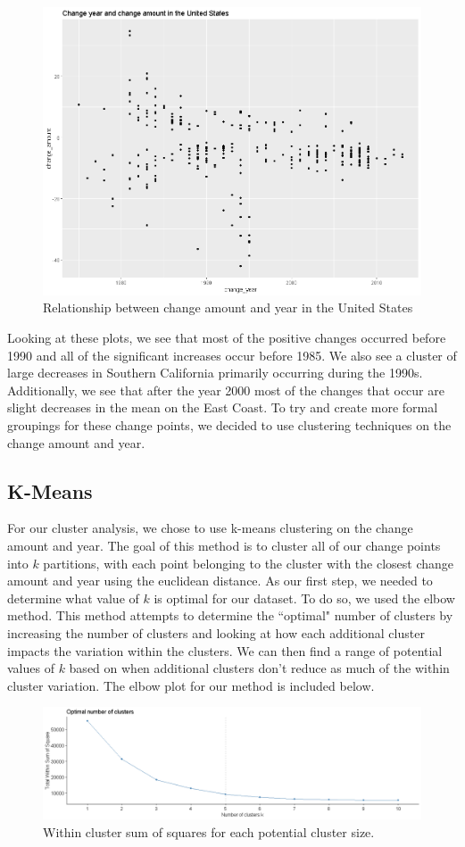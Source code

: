 \documentclass[11pt, oneside]{article}
\theoremstyle{definition}
\begin{document}
\begin{figure}[H]
    \centering
    \includegraphics[width=0.7\linewidth]{plots/clustering/year_amount.png}
    \caption{Relationship between change amount and year in the United States}
    \label{year_amount}
\end{figure}

Looking at these plots, we see that most of the positive changes occurred before 1990 and all of the significant increases occur before 1985. We also see a cluster of large decreases in Southern California primarily occurring during the 1990s. Additionally, we see that after the year 2000 most of the changes that occur are slight decreases in the mean on the East Coast. To try and create more formal groupings for these change points, we decided to use clustering techniques on the change amount and year.

\subsection{K-Means}
For our cluster analysis, we chose to use k-means clustering on the change amount and year. The goal of this method is to cluster all of our change points into $k$ partitions, with each point belonging to the cluster with the closest change amount and year using the euclidean distance. As our first step, we needed to determine what value of $k$ is optimal for our dataset. To do so, we used the elbow method. This method attempts to determine the ``optimal" number of clusters by increasing the number of clusters and looking at how each additional cluster impacts the variation within the clusters. We can then find a range of potential values of $k$ based on when additional clusters don't reduce as much of the within cluster variation. The elbow plot for our method is included below. 

\begin{figure}[H] %
    \centering
    \includegraphics[width=\linewidth]{plots/clustering/elbow.png}
    \caption{Within cluster sum of squares for each potential cluster size.}
    \label{elbow}
\end{figure}
\end{document}
